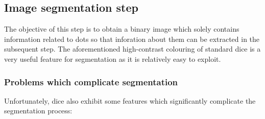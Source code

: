\subsection{Image segmentation step}
The objective of this step is to obtain a binary image which solely contains information related to dots so that inforation about them can be extracted in the subsequent step. The aforementioned high-contrast colouring of standard dice is a very useful feature for segmentation as it is relatively easy to exploit.

\subsubsection{Problems which complicate segmentation}
Unfortunately, dice also exhibit some features which significantly complicate the segmentation process:


